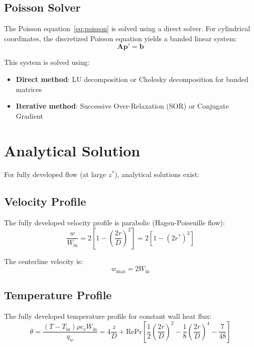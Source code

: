 \documentclass[12pt,a4paper]{article}
\newcommand{\Rey}{\text{Re}}
\newcommand{\Pran}{\text{Pr}}
\begin{document}
\subsection{Poisson Solver}

The Poisson equation~\eqref{eq:poisson} is solved using a direct solver. For cylindrical coordinates, the discretized Poisson equation yields a banded linear system:
\begin{equation}
    \mathbf{A}\mathbf{p}' = \mathbf{b}
\end{equation}

This system is solved using:
\begin{itemize}
    \item \textbf{Direct method}: LU decomposition or Cholesky decomposition for banded matrices
    \item \textbf{Iterative method}: Successive Over-Relaxation (SOR) or Conjugate Gradient
\end{itemize}

\newpage

\section{Analytical Solution}

For fully developed flow (at large $z^*$), analytical solutions exist:

\subsection{Velocity Profile}

The fully developed velocity profile is parabolic (Hagen-Poiseuille flow):
\begin{equation}
    \frac{w}{W_{\text{in}}} = 2\left[1 - \left(\frac{2r}{D}\right)^2\right] = 2\left[1 - (2r^*)^2\right]
    \label{eq:analytical_velocity}
\end{equation}

The centerline velocity is:
\begin{equation}
    w_{\text{max}} = 2W_{\text{in}}
\end{equation}

\subsection{Temperature Profile}

The fully developed temperature profile for constant wall heat flux:
\begin{equation}
    \theta = \frac{(T - T_{\text{in}})\rho c_v W_{\text{in}}}{q_w} = 4\frac{z}{D} + \Rey\Pran\left[\frac{1}{2}\left(\frac{2r}{D}\right)^2 - \frac{1}{8}\left(\frac{2r}{D}\right)^4 - \frac{7}{48}\right]
    \label{eq:analytical_temperature}
\end{equation}
\end{document}
